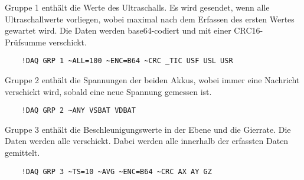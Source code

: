 Gruppe 1 enthält die Werte des Ultraschalls. Es wird gesendet, wenn alle Ultraschallwerte vorliegen, wobei maximal  nach dem Erfassen des ersten Wertes gewartet wird. Die Daten werden base64-codiert und mit einer CRC16-Prüfsumme verschickt.
\begin{verbatim}
	!DAQ GRP 1 ~ALL=100 ~ENC=B64 ~CRC _TIC USF USL USR 
\end{verbatim}

Gruppe 2 enthält die Spannungen der beiden Akkus, wobei immer eine Nachricht verschickt wird, sobald eine neue Spannung gemessen ist.
\begin{verbatim}
	!DAQ GRP 2 ~ANY VSBAT VDBAT 
\end{verbatim}

Gruppe 3 enthält die Beschleunigungswerte in der Ebene und die Gierrate. Die Daten werden alle  verschickt. Dabei werden alle innerhalb der  erfassten Daten gemittelt.
\begin{verbatim}
	!DAQ GRP 3 ~TS=10 ~AVG ~ENC=B64 ~CRC AX AY GZ 
\end{verbatim}


